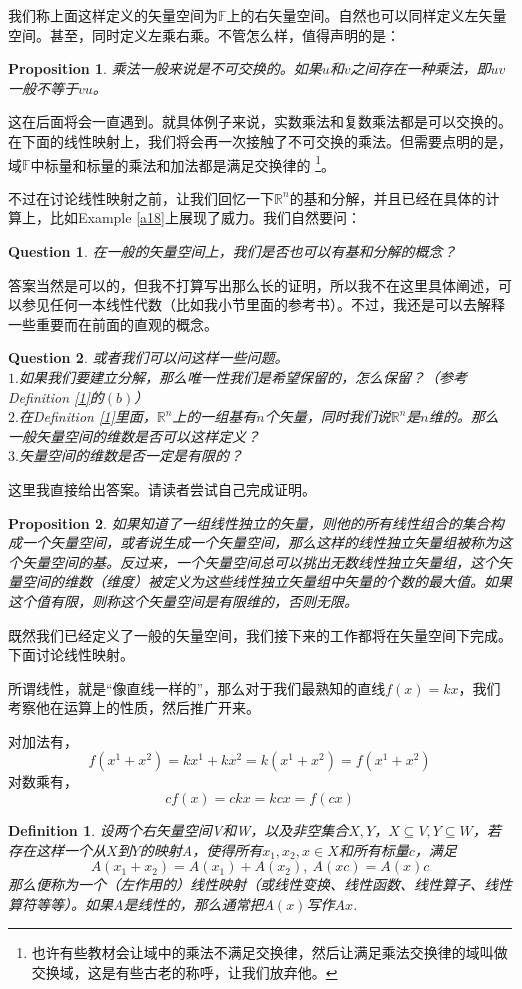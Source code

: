 \documentclass[11pt,a4paper,openany]{book}%
\theoremstyle{plain}%
\newtheorem{pro}{Proposition}[chapter]%
\newtheorem{que}{Question}[chapter]%
\newtheorem{defi}{Definition}[chapter]%
\begin{document}
我们称上面这样定义的矢量空间为$\mathbb{F}$上的右矢量空间。自然也可以同样定义左矢量空间。甚至，同时定义左乘右乘。不管怎么样，值得声明的是：
\begin{pro}
\label{乘法}
乘法一般来说是不可交换的。如果$u$和$v$之间存在一种乘法，即$uv$一般不等于$vu$。
\end{pro}
这在后面将会一直遇到。就具体例子来说，实数乘法和复数乘法都是可以交换的。在下面的线性映射上，我们将会再一次接触了不可交换的乘法。但需要点明的是，域$\mathbb{F}$中标量和标量的乘法和加法都是满足交换律的
\footnote{也许有些教材会让域中的乘法不满足交换律，然后让满足乘法交换律的域叫做交换域，这是有些古老的称呼，让我们放弃他。}。

\indent 不过在讨论线性映射之前，让我们回忆一下$\mathbb{R}^{n}$的基和分解，并且已经在具体的计算上，比如Example \ref{a18}上展现了威力。我们自然要问：
\begin{que}
\label{a14}
在一般的矢量空间上，我们是否也可以有基和分解的概念？
\end{que}

答案当然是可以的，但我不打算写出那么长的证明，所以我不在这里具体阐述，可以参见任何一本线性代数（比如我小节里面的参考书）。不过，我还是可以去解释一些重要而在前面的直观的概念。
\begin{que}\label{a15}或者我们可以问这样一些问题。\\
$1.$如果我们要建立分解，那么唯一性我们是希望保留的，怎么保留？（参考Definition \ref{1}的$(b)$）\\
$2.$在Definition \ref{1}里面，$\mathbb{R}^{n}$上的一组基有$n$个矢量，同时我们说$\mathbb{R}^{n}$是$n$维的。那么一般矢量空间的维数是否可以这样定义？\\
$3.$矢量空间的维数是否一定是有限的？
\end{que}
这里我直接给出答案。请读者尝试自己完成证明。
\begin{pro}
\label{ji}
如果知道了一组线性独立的矢量，则他的所有线性组合的集合构成一个矢量空间，或者说生成一个矢量空间，那么这样的线性独立矢量组被称为这个矢量空间的{\kaishu 基}。反过来，一个矢量空间总可以挑出无数线性独立矢量组，这个矢量空间的维数（维度）被定义为这些线性独立矢量组中矢量的个数的最大值。如果这个值有限，则称这个矢量空间是有限维的，否则无限。
\end{pro}
既然我们已经定义了一般的矢量空间，我们接下来的工作都将在矢量空间下完成。下面讨论线性映射。

所谓线性，就是“像直线一样的”，那么对于我们最熟知的直线$f(x)=kx$，我们考察他在运算上的性质，然后推广开来。

对加法有，
\[
f(x^{1}+x^{2})=kx^{1}+kx^{2}=k(x^1+x^2)=f(x^1+x^2)
\]
\indent 对数乘有，
\[
cf(x)=ckx=kcx=f(cx)
\]
\begin{defi}
设两个右矢量空间V和W，以及非空集合$X,Y$，$X\subseteq V,Y\subseteq W$，若存在这样一个从$X$到$Y$的映射A，使得所有$x_{1},x_{2},x \in X$和所有标量$c$，满足
\[
A(x_{1}+x_{2})=A(x_{1})+A(x_{2}),\ A(xc)=A(x)c
\]
那么便称为一个（左作用的）线性映射（或线性变换、线性函数、线性算子、线性算符等等）。如果A是线性的，那么通常把$A(x)$写作$Ax$.
\end{defi}
\end{document}
